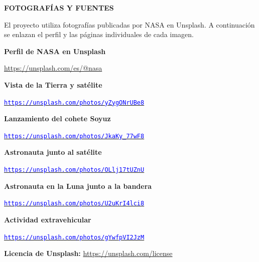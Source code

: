 \documentclass[10pt,a4paper]{article}
\newcommand{\heading}[2]{\par\vspace{8pt}{\large\bfseries\color{navy}#1}\hfill{\footnotesize\bfseries\color{blue}#2}\par\vspace{-1pt}{\color{blue}\rule{\linewidth}{1pt}}\vspace{3pt}}
\begin{document}
\newpage
\heading{18  Créditos de imágenes}{FOTOGRAFÍAS Y FUENTES}
El proyecto utiliza fotografías publicadas por NASA en Unsplash. A continuación se enlazan el perfil y las páginas individuales de cada imagen.
\begin{infobox}
\textbf{Perfil de NASA en Unsplash}\par
\url{https://unsplash.com/es/@nasa}\par
\end{infobox}
\vspace{5pt}
{\small\bfseries\color{navy}Vista de la Tierra y satélite}\par
\href{https://unsplash.com/es/fotos/vista-de-la-tierra-y-satelite-yZygONrUBe8}{\textcolor{blue}{\nolinkurl{https://unsplash.com/photos/yZygONrUBe8}}}\par
\vspace{5pt}
{\small\bfseries\color{navy}Lanzamiento del cohete Soyuz}\par
\href{https://unsplash.com/es/fotos/el-cohete-soyuz-se-lanza-desde-la-plataforma-de-lanzamiento-de-baikonur-JkaKy_77wF8}{\textcolor{blue}{\nolinkurl{https://unsplash.com/photos/JkaKy_77wF8}}}\par
\vspace{5pt}
{\small\bfseries\color{navy}Astronauta junto al satélite}\par
\href{https://unsplash.com/es/fotos/fotografia-de-un-astronauta-junto-al-satelite-OLlj17tUZnU}{\textcolor{blue}{\nolinkurl{https://unsplash.com/photos/OLlj17tUZnU}}}\par
\vspace{5pt}
{\small\bfseries\color{navy}Astronauta en la Luna junto a la bandera}\par
\href{https://unsplash.com/es/fotos/astronauta-de-pie-en-la-luna-junto-a-la-bandera-de-eeuu-U2uKrI4lci8}{\textcolor{blue}{\nolinkurl{https://unsplash.com/photos/U2uKrI4lci8}}}\par
\vspace{5pt}
{\small\bfseries\color{navy}Actividad extravehicular}\par
\href{https://unsplash.com/es/fotos/astronauta-de-la-nasa-realiza-actividad-extravehicular-gYwfpVI2JzM}{\textcolor{blue}{\nolinkurl{https://unsplash.com/photos/gYwfpVI2JzM}}}\par
\vspace{8pt}
\textbf{Licencia de Unsplash:} \url{https://unsplash.com/license}



\end{document}

